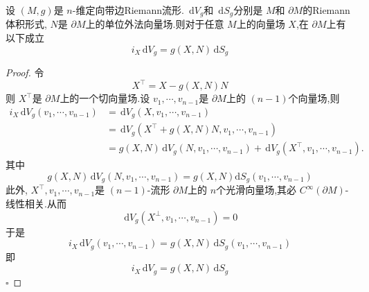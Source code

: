 \documentclass[../../main.tex]{subfiles}
\begin{document}
\begin{lemma}
    设 \(  \left( M,g \right)   \)是 \(  n  \)-维定向带边Riemann流形. \(   \,\mathrm{d} V_{g}\)和 \(   \,\mathrm{d} S_{g} \)分别是 \(  M  \)和 \(   \partial M  \)的Riemann体积形式, \(  N  \)是 \(   \partial M  \)上的单位外法向量场.则对于任意 \(  M  \)上的向量场 \(  X  \),在 \(   \partial M  \)上有 以下成立 \[
    i_{X} \,\mathrm{d} V_{g}= g\left( X,N \right)\,\mathrm{d} S_{g} 
    \]  
\end{lemma}
\begin{proof}
令 \[
    X^{\top}= X- g\left( X,N \right)N 
    \]则 \(  X^{\top}  \)是 \(   \partial M  \)上的一个切向量场.设 \(   v_1,\cdots,v_{n-1}  \)是 \(   \partial M  \)上的 \(  \left( n-1 \right)   \)个向量场,则 \[
    \begin{aligned}
    i_{X}\,\mathrm{d} V_{g}\left(  v_1,\cdots,v_{n-1} \right)&= \,\mathrm{d} V_{g}\left( X,v_1,\cdots ,v_{n-1} \right) \\ 
     &= \,\mathrm{d} V_{g}\left( X^{\top}+ g\left( X,N \right)N,v_1,\cdots ,v_{n-1}  \right)\\ 
      &=   g\left( X,N \right)\,\mathrm{d} V_{g}\left( N,v_1,\cdots ,v_{n-1} \right)+ \,\mathrm{d} V_{g}\left( X^{\top},v_1,\cdots ,v_{n-1} \right).   
    \end{aligned} 
    \]   其中 \[
    g\left( X,N \right)\,\mathrm{d} V_{g}\left( N, v_1,\cdots,v_{n-1} \right)= g\left( X,N \right)\mathrm{d} S_{g}\left(  v_1,\cdots,v_{n-1}\right)    
    \]此外, \(  X^{\top}, v_1,\cdots,v_{n-1}  \)是 \(  \left( n-1 \right)   \)-流形 \(   \partial M  \)上的 \(  n  \)个光滑向量场,其必 \(  C^{\infty}\left(  \partial M \right)   \)-线性相关.从而 \[
    \,\mathrm{d} V_{g}\left( X^{\perp}, v_1,\cdots,v_{n-1} \right)= 0 
    \]     于是 \[
    i_{X}\,\mathrm{d} V_{g}\left(  v_1,\cdots,v_{n-1} \right)= g\left( X,N \right)\,\mathrm{d} S_{g}\left(  v_1,\cdots,v_{n-1} \right)   
    \]即 \[
    i_{X}\,\mathrm{d} V_{g}= g\left( X,N \right)\,\mathrm{d} S_{g} 
    \]
    \hfill $\square$
\end{proof}
\end{document}
